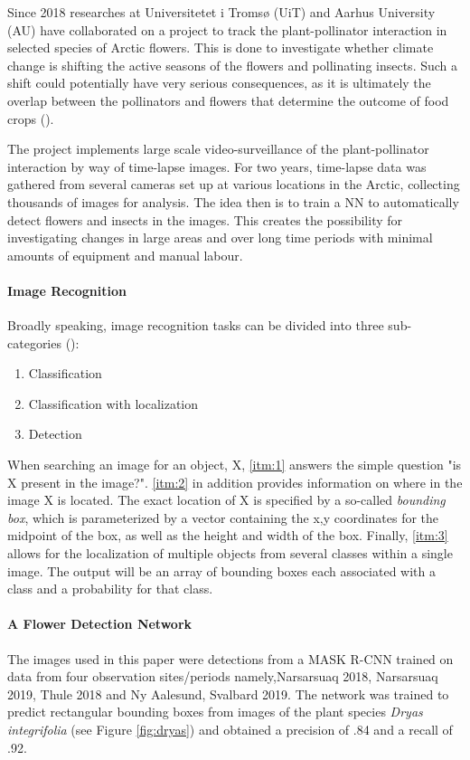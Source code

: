 \documentclass[12pt]{article}
\begin{document}
Since 2018 researches at Universitetet i Tromsø (UiT) and Aarhus University (AU) have collaborated on a project to track the plant-pollinator interaction in selected species of Arctic flowers. This is done to investigate whether climate change is shifting the active seasons of the flowers and pollinating insects. Such a shift could potentially have very serious consequences, as it is ultimately the overlap between the pollinators and flowers that determine the outcome of food crops (\cite{danmarksfrieforskningsfondAaretsOriginaleIde2019}).

The project implements large scale video-surveillance of the plant-pollinator interaction by way of time-lapse images. For two years, time-lapse data was gathered from several cameras set up at various locations in the Arctic, collecting thousands of images for analysis. The idea then is to train a NN to automatically detect flowers and insects in the images. This creates the possibility for investigating changes in large areas and over long time periods with minimal amounts of equipment and manual labour.

\paragraph{Image Recognition}
Broadly speaking, image recognition tasks can be divided into three sub-categories (\cite{deeplearning.aiC4W3L01ObjectLocalization2017}):

\begin{enumerate}
	\item Classification\label{itm:1}
	\item Classification with localization\label{itm:2}
	\item Detection\label{itm:3}
\end{enumerate}

When searching an image for an object, X, \ref{itm:1} answers the simple question "is X present in the image?". \ref{itm:2} in addition provides information on where in the image X is located. The exact location of X is specified by a so-called \textit{bounding box}, which is parameterized by a vector containing the x,y coordinates for the midpoint of the box, as well as the height and width of the box. Finally, \ref{itm:3} allows for the localization of multiple objects from several classes within a single image. The output will be an array of bounding boxes each associated with a class and a probability for that class.

\paragraph{A Flower Detection Network}
The images used in this paper were detections from a MASK R-CNN trained on data from four observation sites/periods namely,Narsarsuaq 2018, Narsarsuaq 2019, Thule 2018 and Ny Aalesund, Svalbard 2019. The network was trained to predict rectangular bounding boxes from images of the plant species \textit{Dryas integrifolia} (see Figure \ref{fig:dryas}) and obtained a precision of .84 and a recall of .92.
\end{document}

